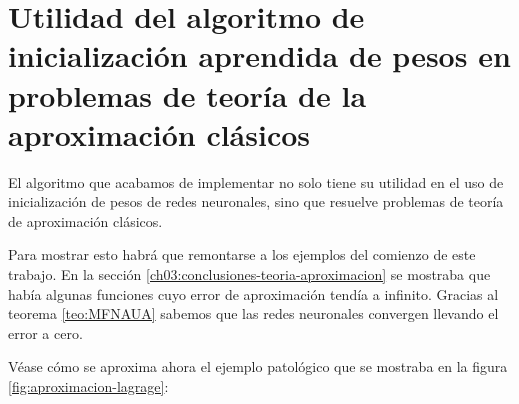 
\section{Utilidad del algoritmo de inicialización aprendida de pesos en problemas de teoría de la aproximación clásicos}

El algoritmo que acabamos de implementar no solo 
tiene su utilidad en el uso de inicialización de pesos 
de redes neuronales, sino que resuelve problemas 
de teoría de aproximación clásicos. 

Para mostrar esto habrá que remontarse a los ejemplos
del comienzo de este trabajo.  
En la sección \ref{ch03:conclusiones-teoria-aproximacion}
se mostraba que había algunas funciones cuyo error
de aproximación  tendía a infinito.
Gracias al teorema \ref{teo:MFNAUA} sabemos que 
las redes neuronales convergen llevando el error 
a cero. 

Véase cómo se aproxima ahora el ejemplo patológico
que se mostraba en la figura \ref{fig:aproximacion-lagrage}: 

